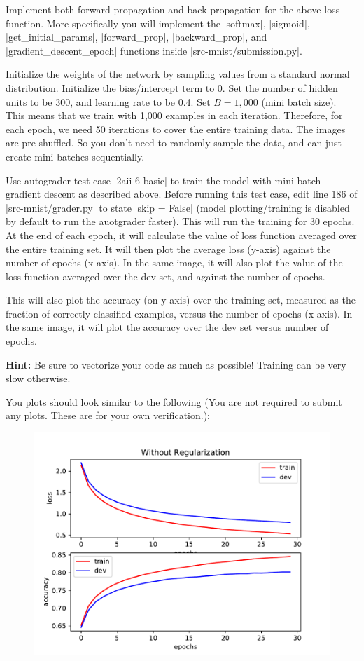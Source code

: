 \item {} 

Implement both forward-propagation and back-propagation for the above loss function.
More specifically you will implement the |softmax|, |sigmoid|, |get_initial_params|, |forward_prop|, 
|backward_prop|, and |gradient_descent_epoch| functions inside |src-mnist/submission.py|.

Initialize the weights of the network by sampling values from a standard normal
distribution. Initialize the bias/intercept term to 0.
Set the number of hidden units to be 300, and learning rate to be 0.4. Set $B = 1,000$
(mini batch size). This means that we train with 1,000 examples in each iteration.
Therefore, for each epoch, we need 50 iterations to cover the entire training data.
The images are pre-shuffled. So you don't need to randomly sample the data, and can
just create mini-batches sequentially.

Use autograder test case |2aii-6-basic| to train the model with mini-batch gradient descent
as described above. Before running this test case, edit line 186 of |src-mnist/grader.py| to state |skip = False| (model plotting/training is disabled by default to run the auotgrader faster). This will run the training for 30 epochs. At the end of each epoch, it will calculate
the value of loss function averaged over the entire training set.  It will then plot the average loss (y-axis) against the number of epochs (x-axis). In the same image, it will also plot the value of the loss function averaged over the dev set, and against the number of epochs.

This will also plot the accuracy (on y-axis) over the training set,
measured as the fraction of correctly classified examples, versus the number of epochs
(x-axis). In the same image, it will plot the accuracy over the dev set versus number of epochs.

\textbf{Hint:} Be sure to vectorize your code as much as possible! Training can be
very slow otherwise.

\clearpage\newpage

You plots should look similar to the following (You are not required to submit any plots.  These are for your own verification.):

\begin{figure}[H]
    \centering
    \includegraphics[scale=0.75]{02-mnist/baseline.pdf}
\end{figure}
